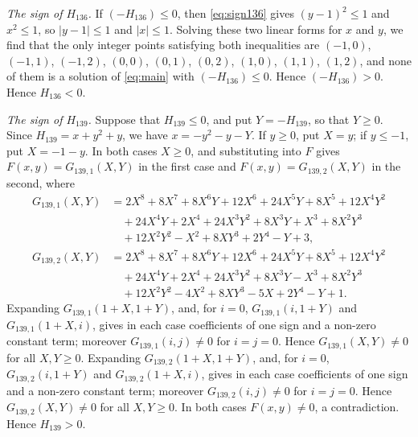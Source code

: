 \documentclass[11pt]{article}
\begin{document}
\emph{The sign of $H_{136}$.} If $(-H_{136})\leq0$, then \eqref{eq:sign136} gives $(y-1)^2\leq 1$ and $x^2\leq 1$, so $|y-1|\leq1$ and $|x|\leq1$. Solving these two linear forms for $x$ and $y$, we find that the only integer points satisfying both inequalities are $(-1,0)$, $(-1,1)$, $(-1,2)$, $(0,0)$, $(0,1)$, $(0,2)$, $(1,0)$, $(1,1)$, $(1,2)$, and none of them is a solution of \eqref{eq:main} with $(-H_{136})\leq0$. Hence $(-H_{136})>0$. Hence $H_{136}<0$.

\emph{The sign of $H_{139}$.} Suppose that $H_{139}\leq0$, and put $Y=-H_{139}$, so that $Y\geq0$. Since $H_{139}=x+y^{2}+y$, we have $x=-y^{2}-y-Y$. If $y\geq0$, put $X=y$; if $y\leq-1$, put $X=-1-y$. In both cases $X\geq0$, and substituting into $F$ gives $F(x,y)=G_{139,1}(X,Y)$ in the first case and $F(x,y)=G_{139,2}(X,Y)$ in the second, where
\begin{align*}
G_{139,1}(X,Y)&=2X^{8}+8X^{7}+8X^{6}Y+12X^{6}+24X^{5}Y+8X^{5}+12X^{4}Y^{2}\\
&\quad+24X^{4}Y+2X^{4}+24X^{3}Y^{2}+8X^{3}Y+X^{3}+8X^{2}Y^{3}\\
&\quad+12X^{2}Y^{2}-X^{2}+8XY^{3}+2Y^{4}-Y+3,\\
G_{139,2}(X,Y)&=2X^{8}+8X^{7}+8X^{6}Y+12X^{6}+24X^{5}Y+8X^{5}+12X^{4}Y^{2}\\
&\quad+24X^{4}Y+2X^{4}+24X^{3}Y^{2}+8X^{3}Y-X^{3}+8X^{2}Y^{3}\\
&\quad+12X^{2}Y^{2}-4X^{2}+8XY^{3}-5X+2Y^{4}-Y+1.
\end{align*}
Expanding $G_{139,1}(1+X,1+Y)$, and, for $i=0$, $G_{139,1}(i,1+Y)$ and $G_{139,1}(1+X,i)$, gives in each case coefficients of one sign and a non-zero constant term; moreover $G_{139,1}(i,j)\neq0$ for $i=j=0$. Hence $G_{139,1}(X,Y)\neq0$ for all $X,Y\geq0$. Expanding $G_{139,2}(1+X,1+Y)$, and, for $i=0$, $G_{139,2}(i,1+Y)$ and $G_{139,2}(1+X,i)$, gives in each case coefficients of one sign and a non-zero constant term; moreover $G_{139,2}(i,j)\neq0$ for $i=j=0$. Hence $G_{139,2}(X,Y)\neq0$ for all $X,Y\geq0$. In both cases $F(x,y)\neq0$, a contradiction. Hence $H_{139}>0$.
\end{document}
